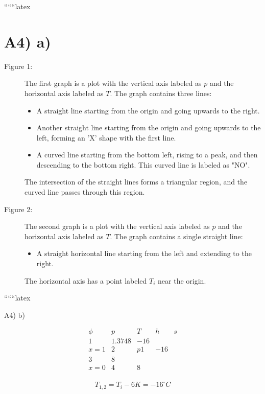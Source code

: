 
``````latex


\section*{A4) a)}

\begin{description}
    \item[Figure 1:] The first graph is a plot with the vertical axis labeled as \( p \) and the horizontal axis labeled as \( T \). The graph contains three lines:
    \begin{itemize}
        \item A straight line starting from the origin and going upwards to the right.
        \item Another straight line starting from the origin and going upwards to the left, forming an 'X' shape with the first line.
        \item A curved line starting from the bottom left, rising to a peak, and then descending to the bottom right. This curved line is labeled as "NO".
    \end{itemize}
    The intersection of the straight lines forms a triangular region, and the curved line passes through this region.
    
    \item[Figure 2:] The second graph is a plot with the vertical axis labeled as \( p \) and the horizontal axis labeled as \( T \). The graph contains a single straight line:
    \begin{itemize}
        \item A straight horizontal line starting from the left and extending to the right.
    \end{itemize}
    The horizontal axis has a point labeled \( T_i \) near the origin.
\end{description}

``````latex


A4) b)

\[
\begin{array}{ccccc}
\phi & p & T & h & s \\
1 & 1.3748 & -16 & & \\
x=1 & 2 & p1 & -16 & \\
3 & 8 & & & \\
x=0 & 4 & 8 & & \\
\end{array}
\]

\[
T_{1,2} = T_i - 6K = -16^\circ C
\]

